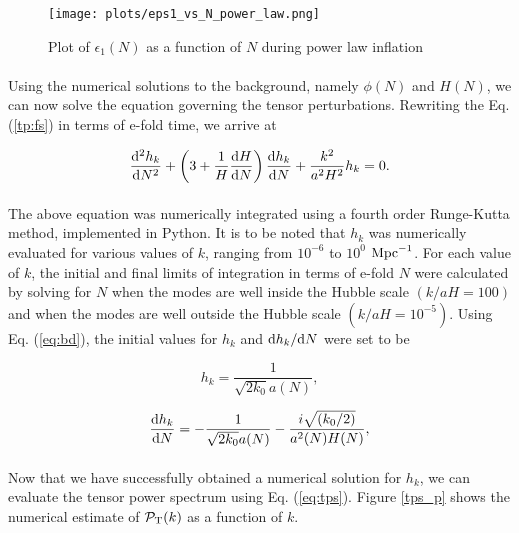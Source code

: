 \documentclass[12pt,a4paper,oneside]{book}
\begin{document}
\begin{figure}
\begin{center}
\texttt{[image: plots/eps1\_vs\_N\_power\_law.png]}
\caption[Plot of $\epsilon_1(N)$ as a function of $N$ during power law inflation]{Plot of $\epsilon_1(N)$ as a function of $N$ during power law inflation}
\label{epsilon_p}
\end{center}
\end{figure}

\paragraph*{} Using the numerical solutions to the background, namely $\phi(N)$ and $H(N)$, we can now solve the equation 
governing the tensor perturbations. Rewriting the Eq. (\ref{tp:fs}) in terms of e-fold time, we arrive at

\begin{equation}\label{eq:temp2}
\frac{{\rm d}^2h_k}{{\rm d}N^2} +\left (3+\frac{1}{H}\frac{{\rm d}H}{{\rm d}N}\right)\frac{{\rm d}h_k}{{\rm d}N} + \frac{k^2}{a^2H^2}h_k = 0.
\end{equation}

\paragraph*{} The above equation was numerically integrated using a fourth order Runge-Kutta method, implemented in Python. 
It is to be noted that $h_k$ was numerically evaluated for various values of $k$, ranging from $10^{-6}$ to $10^{0}$ ${\rm Mpc}^{-1}$. 
For each value of $k$, the initial and final limits of integration in terms of e-fold $N$ were calculated by solving for $N$ when the 
modes are well inside the Hubble scale $(k/aH =  100)$ and when the modes are well outside the Hubble scale $(k/aH =  10^{-5})$. 
Using Eq. (\ref{eq:bd}), the initial values for $h_k$ and ${\rm d}h_k/{\rm d}N$ were set to be

\begin{equation}
h_k  = \frac{1}{\sqrt{2k_0}a(N)},
\end{equation}

\begin{equation}
\frac{{\rm d}h_k}{{\rm d}N} = -\frac{1}{\sqrt{2k_0}a(N)} - \frac{i\sqrt{(k_0/2)}}{a^2(N)H(N)},
\end{equation}

\paragraph*{} Now that we have successfully obtained a numerical solution for $h_k$, 
we can evaluate the tensor power spectrum using Eq. (\ref{eq:tps}). Figure \ref{tps_p} 
shows the numerical estimate of $\mathcal{P}_{\rm T}(k)$ as a function of $k$.
\end{document}
